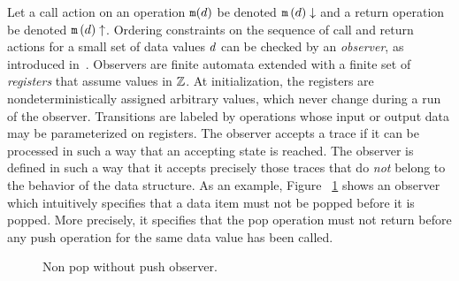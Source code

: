Let a call action on an operation ${\tt m}(d)$ be denoted
${\tt m}\left(d\right)\downarrow$ and a return operation be denoted
${\tt m}\left(d\right)\uparrow$. Ordering constraints on the sequence of
call and return actions for a small set of data values $d$ can be
checked by an {\em observer},
as introduced in~\cite{AHHR:integrated}. 
%
Observers are
finite automata extended with a finite set of {\em registers}
that assume values in ${\mathbb Z}$. 
%
At initialization,
the registers are nondeterministically
assigned arbitrary values, which never change
during a run of the observer. 
%
Transitions are labeled by 
operations whose input or output data may be parameterized on registers.
%
%
The observer accepts a trace if it can  be processed in such a way that
an accepting state is reached.
%
The observer is defined in such a way that it accepts precisely those
traces that do {\em not} belong to the behavior
of the data structure.
As an example, Figure ~\ref{fig:nonpopobserver:fig} shows an observer which intuitively specifies that 
a data item must not be popped before it is popped. More precisely, it
specifies that the pop operation must not return before any push operation
for the same data value has been called.

\begin{figure}
\center 

\caption{Non pop without push observer.}
\label{fig:nonpopobserver:fig}
\end{figure}

